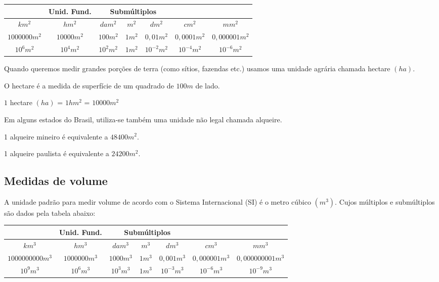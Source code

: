  \begin{table}[H]
 \centering
 \begin{tabular}{|c|c|c|c|c|c|c|} \hline
 \rowcolor{cinza}
  \multicolumn{3}{|c|}{\textbf{Múltiplos}} 
 & \multicolumn{1}{|c|}{\textbf{Unid. Fund.}} & \multicolumn{3}{|c|}{\textbf{Submúltiplos}} \\ 
 \hline
 $km^2$ & $hm^2$ & $dam^2$ & $m^2$ & $dm^2$ & $cm^2$ & $mm^2$ \\
 \hline
 $1000 000 m^2$ & $10 000 m^2$ & $100 m^2$ & $1 m^2$ & $0,01 m^2$ & $0,0001 m^2$ & $0,000001 m^2$ \\ \hline
 $10^6 m^2$ & $10^4 m^2$ & $10^2 m^2$ & $1 m^2$ & $10^{-2} m^2$ & $10^{-4} m^2$ & $10^{-6} m^2$ \\ \hline
 \end{tabular}
 \end{table}

 Quando queremos medir grandes porções de terra (como sítios, fazendas etc.) usamos uma unidade agrária chamada hectare $(ha)$.

O hectare é a medida de superfície de um quadrado de $100 m$ de lado.

$1$ hectare $(ha)$ = $1 hm^2$ = $10 000 m^2$

Em alguns estados do Brasil, utiliza-se também uma unidade não legal chamada alqueire.

    1 alqueire mineiro é equivalente a $48 400 m^2$.
    
    1 alqueire paulista é equivalente a $24 200 m^2$.
    

    
\subsection{Medidas de volume}
A unidade padrão para medir volume de acordo com o Sistema Internacional (SI) é o metro cúbico $(m^3)$. Cujos múltiplos e submúltiplos são dados pela tabela abaixo:

 \begin{table}[H]
 \centering
 \begin{tabular}{|c|c|c|c|c|c|c|} \hline
 \rowcolor{cinza}
  \multicolumn{3}{|c|}{\textbf{Múltiplos}} 
 & \multicolumn{1}{|c|}{\textbf{Unid. Fund.}} & \multicolumn{3}{|c|}{\textbf{Submúltiplos}} \\ 
 \hline
 $km^3$ & $hm^3$ & $dam^3$ & $m^3$ & $dm^3$ & $cm^3$ & $mm^3$ \\
 \hline
 $1000 000 000 m^3$ & $1000 000 m^3$ & $1000 m^3$ & $1 m^3$ & $0,001 m^3$ & $0,000001 m^3$ & $0,000000001 m^3$ \\ \hline
 $10^9 m^3$ & $10^6 m^3$ & $10^3 m^3$ & $1 m^3$ & $10^{-3} m^3$ & $10^{-6} m^3$ & $10^{-9} m^3$ \\ \hline
 \end{tabular}
\end{table}

